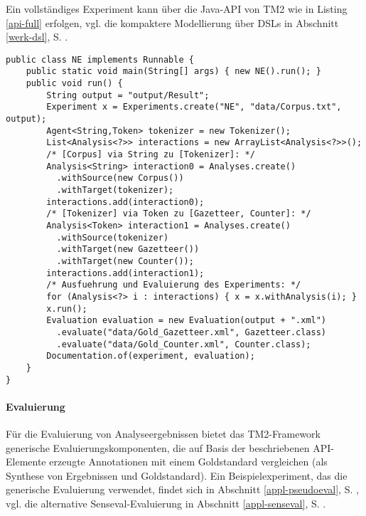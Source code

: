 \documentclass[abstracton, 12pt]{scrartcl}
\begin{document}
Ein vollständiges Experiment kann über die Java-API von TM2 wie in Listing \ref{api-full} erfolgen, vgl. die kompaktere Modellierung über DSLs in Abschnitt \ref{werk-dsl}, S. \pageref{werk-dsl}.

\lstset{language=Java}
\begin{lstlisting}[float, label=api-full, caption={Prinzipielle Modellierung eines einfachen Experiments über die Java-API von TM2, vgl. Abschnitt \ref{werk-dsl}, S. \pageref{werk-dsl} für die alternative Modellierung über eine DSL}]
public class NE implements Runnable {
    public static void main(String[] args) { new NE().run(); }
    public void run() {
        String output = "output/Result";
        Experiment x = Experiments.create("NE", "data/Corpus.txt", output);
        Agent<String,Token> tokenizer = new Tokenizer();
        List<Analysis<?>> interactions = new ArrayList<Analysis<?>>();
        /* [Corpus] via String zu [Tokenizer]: */
        Analysis<String> interaction0 = Analyses.create()
          .withSource(new Corpus())
          .withTarget(tokenizer);
        interactions.add(interaction0);
        /* [Tokenizer] via Token zu [Gazetteer, Counter]: */
        Analysis<Token> interaction1 = Analyses.create()
          .withSource(tokenizer)
          .withTarget(new Gazetteer())
          .withTarget(new Counter());
        interactions.add(interaction1);
        /* Ausfuehrung und Evaluierung des Experiments: */
        for (Analysis<?> i : interactions) { x = x.withAnalysis(i); }
        x.run();
        Evaluation evaluation = new Evaluation(output + ".xml")
          .evaluate("data/Gold_Gazetteer.xml", Gazetteer.class)
          .evaluate("data/Gold_Counter.xml", Counter.class);
        Documentation.of(experiment, evaluation);
    }
}
\end{lstlisting}

\paragraph{Evaluierung}

Für die Evaluierung von Analyseergebnissen bietet das TM2-Framework generische Evaluierungskomponenten, die auf Basis der beschriebenen API-Elemente erzeugte Annotationen mit einem Goldstandard vergleichen (als Synthese von Ergebnissen und Goldstandard). Ein Beispielexperiment, das die generische Evaluierung verwendet, findet sich in Abschnitt \ref{appl-pseudoeval}, S. \pageref{appl-pseudoeval}, vgl. die alternative Senseval-Evaluierung in Abschnitt \ref{appl-senseval}, S. \pageref{appl-senseval}.
\end{document}
